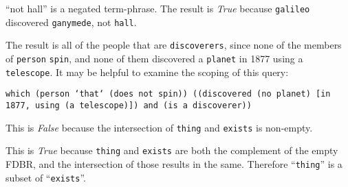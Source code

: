 \documentclass[../main.tex]{subfiles}
\begin{document}
\begin{refsection}


\examplespacing


\examplespacing

\noindent ``not hall'' is a negated term-phrase.  The result is \textit{True} because \texttt{galileo} discovered \texttt{ganymede}, not \texttt{hall}.

\examplespacing


\examplespacing

\noindent The result is all of the people that are \texttt{discoverers}, since none of the members of \texttt{person} \texttt{spin}, and none of them discovered a \texttt{planet} in 1877 using a \texttt{telescope}.  It may be helpful to examine the scoping of this query:
\begin{center}
\texttt{which (person `that` (does not spin)) ((discovered (no planet) [in 1877, using (a telescope)]) and (is a discoverer))}
\end{center}

\examplespacing


\examplespacing

\noindent This is \textit{False} because the intersection of \texttt{thing} and \texttt{exists} is non-empty.

\examplespacing


\examplespacing

\noindent This is \textit{True} because \texttt{thing} and \texttt{exists} are both the complement of the empty FDBR, and the intersection of those results in the same.  Therefore ``\texttt{thing}'' is a subset of ``\texttt{exists}''.

\examplespacing


\examplespacing


\end{refsection}
\end{document}
